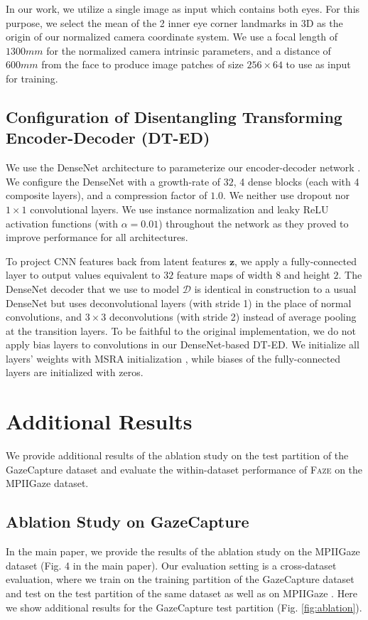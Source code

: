 \documentclass[10pt,twocolumn,letterpaper]{article}
\newcommand{\faze}[0]{\textsc{Faze}\xspace}
\begin{document}
In our work, we utilize a single image as input which contains both eyes. For this purpose, we select the mean of the 2 inner eye corner landmarks in 3D as the origin of our normalized camera coordinate system.
We use a focal length of $1300mm$ for the normalized camera intrinsic parameters, and a distance of $600mm$ from the face to produce image patches of size $256\times 64$ to use as input for training.

\subsection{Configuration of Disentangling Transforming Encoder-Decoder (DT-ED)}
\noindent
We use the DenseNet architecture to parameterize our encoder-decoder network \cite{Huang2017CVPR}.
We configure the DenseNet with a growth-rate of $32$, 4 dense blocks (each with 4 composite layers), and a compression factor of $1.0$. We neither use dropout nor $1\times 1$ convolutional layers.
We use instance normalization \cite{Ulyanov2016arXiv} and leaky ReLU activation functions (with $\alpha=0.01$) throughout the network as they proved to improve performance for all architectures.

To project CNN features back from latent features $\mathbf{z}$, we apply a fully-connected layer to output values equivalent to $32$ feature maps of width $8$ and height $2$.
The DenseNet decoder that we use to model $\mathcal{D}$ is identical in construction to a usual DenseNet but uses deconvolutional layers (with stride 1) in the place of normal convolutions, and $3\times 3$ deconvolutions (with stride 2) instead of average pooling at the transition layers.
To be faithful to the original implementation, we do not apply bias layers to convolutions in our DenseNet-based DT-ED.
We initialize all layers' weights with MSRA initialization \cite{He2015ICCV}, while biases of the fully-connected layers are initialized with zeros.

\section{Additional Results}
\noindent
We provide additional results of the ablation study on the test partition of the GazeCapture dataset and evaluate the within-dataset performance of \faze on the MPIIGaze dataset.

\subsection{Ablation Study on GazeCapture}
\label{sec:ablation}
\noindent
In the main paper, we provide the results of the ablation study on the MPIIGaze dataset (Fig. 4 in the main paper). Our evaluation setting is a cross-dataset evaluation, where we train on the training partition of the GazeCapture dataset \cite{Krafka2016CVPR} and test on the test partition of the same dataset as well as on MPIIGaze \cite{Zhang2015CVPR}. Here we show additional results for the GazeCapture test partition (Fig. \ref{fig:ablation}).
\end{document}
